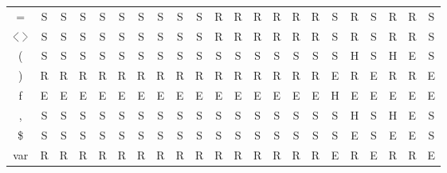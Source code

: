 \documentclass[12pt,a4paper,titlepage,final]{article}
\newcommand{\lang}{\begin{picture}(5,7)
\put(1.1,2.5){\rotatebox{45}{\line(1,0){6.0}}}
\put(1.1,2.5){\rotatebox{315}{\line(1,0){6.0}}}
\end{picture}}
\newcommand{\rang}{\begin{picture}(5,7)
\put(.1,2.5){\rotatebox{135}{\line(1,0){6.0}}}
\put(.1,2.5){\rotatebox{225}{\line(1,0){6.0}}}
\end{picture}}
\begin{document}
\begin{table}[ht]
\begin{tabular}{c|ccccccccccccccccccccc}
=               & S  &  S  & S & S &  S  & S & S & S  &  S  &   R     &    R    & R  & R  & R & R  & S & R & S & R & R  & S   \\ %
$\lang$ $\rang$ & S  &  S  & S & S &  S  & S & S & S  &  S  &   R     &    R    & R  & R  & R & R  & S & R & S & R & R  & S   \\ %
(               & S  &  S  & S & S &  S  & S & S & S  &  S  &   S     &    S    & S  & S  & S & S  & S & H & S & H & E  & S   \\ %
)               & R  &  R  & R & R &  R  & R & R & R  &  R  &   R     &    R    & R  & R  & R & R  & E & R & E & R & R  & E   \\ %
f               & E  &  E  & E & E &  E  & E & E & E  &  E  &   E     &    E    & E  & E  & E & E  & H & E & E & E & E  & E   \\ %
,               & S  &  S  & S & S &  S  & S & S & S  &  S  &   S     &    S    & S  & S  & S & S  & S & H & S & H & E  & S   \\ %
\$              & S  &  S  & S & S &  S  & S & S & S  &  S  &   S     &    S    & S  & S  & S & S  & S & E & S & E & E  & S   \\ %
var             & R  &  R  & R & R &  R  & R & R & R  &  R  &   R     &    R    & R  & R  & R & R  & E & R & E & R & R  & E      %
\end{tabular}
\end{table}
\end{document}
